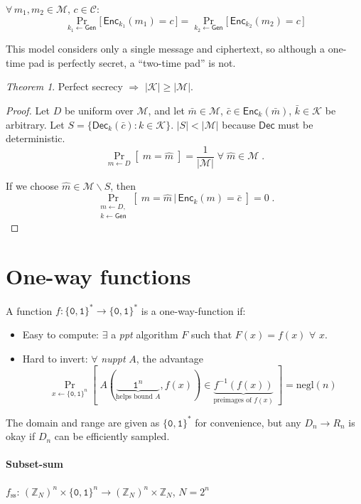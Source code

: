 \documentclass[11pt]{article}
\newcommand{\Gen}{\ensuremath{\mathsf{Gen}}}
\newcommand{\Enc}{\ensuremath{\mathsf{Enc}}}
\newcommand{\Dec}{\ensuremath{\mathsf{Dec}}}
\newcommand{\bit}{\ensuremath{\{\texttt{0},\texttt{1}\}}}
\newcommand{\abs}[1]{{\ensuremath{\left\vert#1\right\vert}}}
\newcommand{\ZZ}{\ensuremath{\mathds{Z}}}
\newcommand{\K}{\ensuremath{\mathcal{K}}}
\newcommand{\M}{\ensuremath{\mathcal{M}}}
\newcommand{\C}{\ensuremath{\mathcal{C}}}
\newcommand{\ppt}{\textit{ppt}}
\newcommand{\nuppt}{\textit{nuppt}}
\newcommand{\negl}{\text{negl}}
\theoremstyle{remark}
\newtheorem{thm}{Theorem}
\begin{document}
$\forall\, m_1, m_2 \in \M,\, c \in \C$:
\[ \Pr_{k_1\gets\Gen} \big[\, \Enc_{k_1}(m_1) = c \,\big]
 = \Pr_{k_2\gets\Gen} \big[\, \Enc_{k_2}(m_2) = c \,\big] \]

This model considers only a single message and ciphertext,
so although a one-time pad is perfectly secret, a ``two-time pad'' is not.

\begin{thm}
Perfect secrecy $\Rightarrow$ $\abs{\K} \ge \abs{\M}$.
\begin{proof}
Let $D$ be uniform over $\M$, and
let $\bar{m} \in \M$, $\bar{c} \in \Enc_k(\bar{m})$, $\bar{k}\in \K$ be arbitrary.
Let $S = \{ \Dec_k(\bar{c}) : k \in \K \}$.
$\abs{S} < \abs{\M}$ because $\Dec$ must be deterministic.
\[ \Pr_{m \gets D}[\;m = \hat{m}\;] = \frac{1}{\abs{\M}} \; \forall \; \hat{m} \in \M \; \text{.} \]

If we choose $\hat{m} \in \M\backslash S$, then
\[ \Pr_{\substack{m\gets D,\\k \gets \Gen}}[\; m = \hat{m} \,\vert\, \Enc_k(m) = \bar{c}\;] = 0 \; \text{.} \]
\end{proof}
\end{thm}

\section{One-way functions}

A function $f: \bit^* \rightarrow \bit^*$ is a one-way-function if:
\begin{itemize}
\item Easy to compute: $\exists$ a \ppt{} algorithm $F$ such that $F(x) = f(x)$ $\forall$ $x$.
\item Hard to invert: $\forall$ \nuppt{} $A$, the advantage
  \[ \Pr_{x\gets \bit^n}[\;
     A(\underbrace{\;\;\;\;\;\;\texttt{1}^n\;\;\;\;\;\;}_{\text{helps bound $A$}}, f(x))
     \in \underbrace{f^{-1}(f(x))}_{\text{preimages of $f(x)$}}
  \;] = \negl(n) \]
\end{itemize}

The domain and range are given as $\bit^*$ for convenience,
but any $D_n \rightarrow R_n$ is okay if $D_n$ can be efficiently sampled.

\paragraph{Subset-sum}
$f_{\text{ss}}$: $(\ZZ_N)^n \times \bit^n \rightarrow (\ZZ_N)^n \times \ZZ_N$, $N = 2^n$
\end{document}
